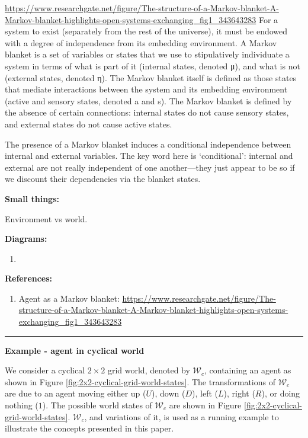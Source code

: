 \url{https://www.researchgate.net/figure/The-structure-of-a-Markov-blanket-A-Markov-blanket-highlights-open-systems-exchanging_fig1_343643283}
For a system to exist (separately from the rest of the universe), it must be endowed with a degree of independence  from its embedding environment. A Markov blanket is a set of  variables  or states that we use to stipulatively individuate a system in terms of what is part of it (internal states, denoted μ), and what is not (external states, denoted η). The  Markov blanket itself is defined  as those states that mediate interactions  between  the system and its  embedding  environment (active  and  sensory states, denoted a and s). The Markov blanket is defined by the absence of certain connections: internal states do not cause sensory states, and external states do not cause active states.

The presence  of a  Markov blanket  induces a  conditional  independence  between internal and external  variables.  The  key  word  here  is  ‘conditional’:  internal  and  external  are  not  really independent  of  one another—they  just  appear to  be  so if  we discount  their  dependencies via  the blanket states. 



\textbf{Small things:}
\begin{compactitem}
    \item Environment vs world.

    \item \textbf{Diagrams:}
        \begin{enumerate}
            \item 
        \end{enumerate}

    \item \textbf{References:}
    \begin{enumerate}
        \item Agent as a Markov blanket: \url{https://www.researchgate.net/figure/The-structure-of-a-Markov-blanket-A-Markov-blanket-highlights-open-systems-exchanging_fig1_343643283}
    \end{enumerate}
\end{compactitem}

\noindent\rule{\textwidth}{1mm}

\textbf{Example - agent in cyclical world}

We consider a cyclical $2\times 2$ grid world, denoted by $\mathscr{W}_{c}$, containing an agent as shown in Figure \ref{fig:2x2-cyclical-grid-world-states}.
The transformations of $\mathscr{W}_{c}$ are due to an agent moving either up ($U$), down ($D$), left ($L$), right ($R$), or doing nothing ($1$).
The possible world states of $\mathscr{W}_{c}$ are shown in Figure \ref{fig:2x2-cyclical-grid-world-states}.
$\mathscr{W}_{c}$, and variations of it, is used as a running example to illustrate the concepts presented in this paper.

